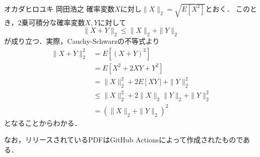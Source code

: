 \documentclass{jsarticle}
\begin{document}
オカダヒロユキ
岡田浩之
確率変数$X$に対し$\|X\|_2=\sqrt{E[X^2]}$とおく．
このとき，2乗可積分な確率変数$X,Y$に対して
\[ \|X+Y\|_2\leq\|X\|_2+\|Y\|_2 \]
が成り立つ．実際，Cauchy-Schwarzの不等式より
\begin{align*}
\|X+Y\|_2^2
&=E[(X+Y)^2] \\
&=E[X^2+2XY+Y^2] \\
&=\|X\|_2^2+2E[XY]+\|Y\|_2^2 \\
&\leq\|X\|_2^2+2\|X\|_2\|Y\|_2+\|Y\|_2^2 \\
&=(\|X\|_2+\|Y\|_2)^2
\end{align*}
となることからわかる．
 
なお，リリースされているPDFはGitHub Actionsによって作成されたものである．
\end{document}
